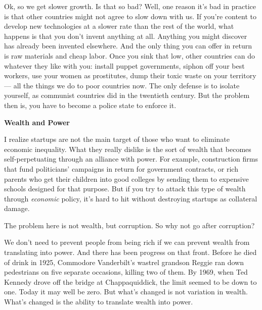 Ok, so we get slower growth. Is that so bad?
                  Well, one reason it's bad in practice is that other countries
                  might not agree to slow down with us. If you're content to
                  develop new technologies at a slower rate than the rest of the
                  world, what happens is that you don't invent anything at all.
                  Anything you might discover has already been invented
                  elsewhere. And the only thing you can offer in return is raw
                  materials and cheap labor. Once you sink that low, other
                  countries can do whatever they like with you: install puppet
                  governments, siphon off your best workers, use your women as
                  prostitutes, dump their toxic waste on your territory ---
                  all the things we do to poor countries now. The only defense
                  is to isolate yourself, as communist countries did in the
                  twentieth century. But the problem then is, you have to become
                  a police state to enforce it.
                  

\textbf{Wealth and Power}

I realize startups are not the main target of
                  those who want to eliminate economic inequality. What they
                  really dislike is the sort of wealth that becomes
                  self-perpetuating through an alliance with power. For example,
                  construction firms that fund politicians' campaigns in return
                  for government contracts, or rich parents who get their
                  children into good colleges by sending them to expensive
                  schools designed for that purpose. But if you try to attack
                  this type of wealth through \emph{economic} policy, it's hard
                  to hit without destroying startups as collateral damage.

The
                  problem here is not wealth, but corruption. So why not go
                  after corruption?

We don't need to prevent people
                  from being rich if we can prevent wealth from translating into
                  power. And there has been progress on that front. Before he
                  died of drink in 1925, Commodore Vanderbilt's wastrel grandson
                  Reggie ran down pedestrians on five separate occasions,
                  killing two of them. By 1969, when Ted Kennedy drove off the
                  bridge at Chappaquiddick, the limit seemed to be down to one.
                  Today it may well be zero. But what's changed is not variation
                  in wealth. What's changed is the ability to translate wealth
                  into power.

